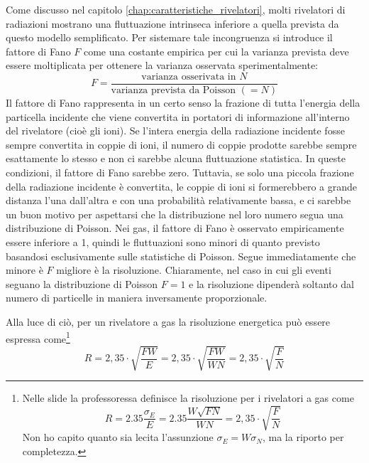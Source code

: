 Come discusso nel capitolo \ref{chap:caratteristiche_rivelatori}, molti rivelatori di radiazioni mostrano una fluttuazione intrinseca inferiore a quella prevista da questo modello semplificato. Per sistemare tale incongruenza si introduce il fattore di Fano $F$ come una costante empirica per cui la varianza prevista deve essere moltiplicata per ottenere la varianza osservata sperimentalmente:
\begin{equation*}
   F=\frac{\text{varianza osserivata in $N$}}{\text{varianza prevista da Poisson $(=N)$}}
\end{equation*}
Il fattore di Fano rappresenta in un certo senso la frazione di tutta l'energia della particella incidente che viene convertita in portatori di informazione all'interno del rivelatore (cioè gli ioni). Se l'intera energia della radiazione incidente fosse sempre convertita in coppie di ioni, il numero di coppie prodotte sarebbe sempre esattamente lo stesso e non ci sarebbe alcuna fluttuazione statistica. In queste condizioni, il fattore di Fano sarebbe zero. Tuttavia, se solo una piccola frazione della radiazione incidente è convertita, le coppie di ioni si formerebbero a grande distanza l'una dall'altra e con una probabilità relativamente bassa, e ci sarebbe un buon motivo per aspettarsi che la distribuzione nel loro numero segua una distribuzione di Poisson. Nei gas, il fattore di Fano è osservato empiricamente essere inferiore a 1, quindi le fluttuazioni sono minori di quanto previsto basandosi esclusivamente sulle statistiche di Poisson. Segue immediatamente che minore è $F$ migliore è la risoluzione. Chiaramente, nel caso in cui gli eventi seguano la distribuzione di Poisson $F=1$ e la risoluzione dipenderà soltanto dal numero di particelle in maniera inversamente proporzionale.

Alla luce di ciò, per un rivelatore a gas la risoluzione energetica può essere espressa come\footnote{Nelle slide la professoressa definisce la risoluzione per i rivelatori a gas come
\begin{equation*}
   R
   =2.35\frac{\sigma_E}{E}
   =2.35\frac{W\sqrt{FN}}{WN}
   =2,35 \cdot \sqrt{\frac{F}{N}}
\end{equation*}
Non ho capito quanto sia lecita l'assunzione $\sigma_E=W\sigma_N$, ma la riporto per completezza.}
\begin{equation*}
   R
   =2,35 \cdot \sqrt{\frac{FW}{E}}
   =2,35 \cdot \sqrt{\frac{FW}{WN}}
   =2,35 \cdot \sqrt{\frac{F}{N}}
\end{equation*}

